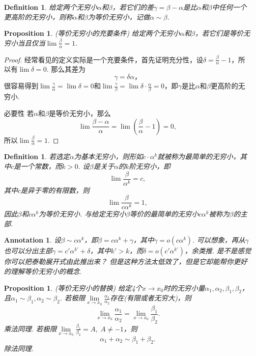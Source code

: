 \documentclass{article}
\newtheorem{proposition}[theorem]{Proposition}
\newtheorem{definition}[theorem]{Definition}
\newtheorem{annotation}[theorem]{Annotation}
\begin{document}
\begin{definition}
\rm 给定两个无穷小$\alpha$和$\beta$，若它们的差$\gamma = \beta - \alpha$是比$\alpha$和$\beta$中任何一个更高阶的无穷小，则称$\alpha$和$\beta$为{\color{red}等价无穷小}，记做$\alpha \sim \beta$.
\end{definition}

\begin{proposition}
\rm {\color{red} (等价无穷小的充要条件)} 给定两个无穷小$\alpha$和$\beta$，若它们是等价无穷小当且仅当$\lim \frac{\beta}{\alpha} = 1$.
\end{proposition}

\begin{proof}
经常看见的定义实际是一个充要条件，首先证明{\color{blue}充分性}，设$\delta = \frac{\beta}{\alpha} - 1$，所以有$\lim \delta = 0$. 那么其差为
$$
\gamma = \delta \alpha，
$$
很容易得到$\lim \frac{\gamma}{\alpha} =\lim \delta = 0$和$\lim \frac{\gamma}{\beta} = \lim \delta\cdot\frac{\alpha}{\beta} = 0$，即$\gamma$是比$\alpha$和$\beta$更高阶的无穷小.

{\color{blue}必要性} 若$\alpha$和$\beta$是等价无穷小，那么
$$
\lim \frac{\beta-\alpha}{\alpha} = \lim (\frac{\beta}{\alpha} - 1) = 0,
$$
所以$\lim \frac{\beta}{\alpha} = 1$.
\end{proof}


\begin{definition}
\rm 若选定$\alpha$为基本无穷小，则形如$c\cdot \alpha^k$就被称为{\color{red}最简单的无穷小}，其中$c$是一个常数，而$k > 0$. 设$\beta$是关于$\alpha$的$k$阶无穷小，即
$$
\lim \frac{\beta}{\alpha^k} = c,
$$
其中$c$是异于零的有限数，则
$$
\lim \frac{\beta}{c\alpha^k} = 1,
$$
因此$\beta$和$c\alpha^k$为等价无穷小. 与给定无穷小$\beta$等价的最简单的无穷小$c\alpha^k$被称为$\beta$的{\color{red}主部}.
\end{definition}

\begin{annotation}
\rm 设$\beta \sim c\alpha^k$，即$\beta = c\alpha^k + \gamma$，其中$\gamma = o(c\alpha^k)$. 可以想象，再从$\gamma$也可以分出主部$\gamma = c'\alpha^{k'} + \delta$，其中$k' > k$，而$\delta = o(c'\alpha^{k'})$，余类推. {\color{blue}是不是感觉你可以把泰勒展开式由此推出来？ 但是这种方法太低效了，但是它却能帮你更好的理解等价无穷小的概念}.
\end{annotation}

\begin{proposition}
\rm {\color{red} (等价无穷小的替换) }给定4个$x \rightarrow x_0$时的无穷小量$\alpha_1,\alpha_2,\beta_1,\beta_2$，且$\alpha_1 \sim \beta_1, \alpha_2 \sim \beta_2$. 若极限$\lim\limits_{x \rightarrow x_0} \frac{\alpha_1}{\alpha_2}$存在(有限或者无穷大)，则
$$
\lim\limits_{x \rightarrow x_0} \frac{\alpha_1}{\alpha_2} = \lim\limits_{x \rightarrow x_0} \frac{\beta_1}{\beta_2}.
$$
乘法同理. 若极限$\lim\limits_{x \rightarrow x_0} \frac{\beta_1}{\beta_2} = A, \; A \neq -1$，则
$$
\alpha_1 + \alpha_2 \sim \beta_1 + \beta_2.
$$ 
除法同理.
\end{proposition}
\end{document}
